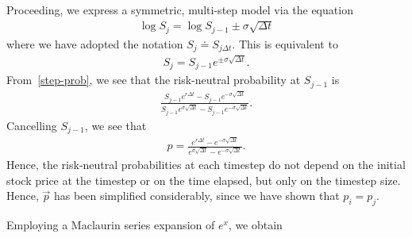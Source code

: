 \documentclass[12pt]{article}
\theoremstyle{plain}
\theoremstyle{definition}
\theoremstyle{remark}
\numberwithin{equation}{section}  %
\begin{document}
Proceeding, we express a symmetric, multi-step model via the equation
\begin{equation*}
	\begin{split}
		\log S_{j} = \log S_{j - 1} \pm \sigma \sqrt{\Delta t}
	\end{split}
\end{equation*}
where we have adopted the notation $S_{j} \doteq S_{j \Delta t}$.
This is equivalent to 
\begin{equation*}
	\begin{split}
		S_{j} = S_{j -1} e^{\pm \sigma \sqrt{\Delta t}}.
	\end{split}
\end{equation*}
From~\eqref{step-prob}, we see that the risk-neutral probability
at $S_{j-1}$ is
\begin{equation*}
	\begin{split}
		\frac{S_{j-1}e^{r \Delta t} - S_{j-1} e^{-\sigma \sqrt{\Delta
		t}}}{S_{j-1}e^{\sigma \sqrt{\Delta t}} - S_{j-1}e^{-\sigma \sqrt{\Delta t}}}.
	\end{split}
\end{equation*}
Cancelling $S_{j-1}$, we see that 
\begin{equation*}
	\begin{split}
		p  = \frac{e^{r \Delta t} -  e^{-\sigma \sqrt{\Delta t}}}{e^{\sigma
			\sqrt{\Delta t}} - e^{-\sigma \sqrt{\Delta t}}}.
		\end{split}
	\end{equation*}
	Hence, the risk-neutral probabilities at each timestep do not depend
	on the initial stock price at the timestep or on the time elapsed,
	but only on the timestep size. Hence, $\vec{p}$ has been simplified
	considerably, since we have shown that $p_{i} = p_{j}$. 

	Employing a Maclaurin series expansion of $e^{x}$, we obtain
\end{document}
